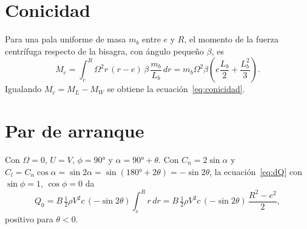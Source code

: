 \section{Conicidad}
Para una pala uniforme de masa $m_b$ entre $e$ y $R$, el momento de la fuerza centrífuga
respecto de la bisagra, con ángulo pequeño $\beta$, es
\begin{equation*}
  M_c=\int_e^R \Omega^2 r\,(r-e)\,\beta\,\frac{m_b}{L_b}\,dr
     = m_b\Omega^2\beta\left(e\frac{L_b}{2}+\frac{L_b^2}{3}\right).
\end{equation*}
Igualando $M_c=M_L-M_W$ se obtiene la ecuación~\eqref{eq:conicidad}.

\section{Par de arranque}
Con $\Omega=0$, $U=V$, $\phi=\ang{90}$ y $\alpha=\ang{90}+\theta$. Con $C_n=2\sin\alpha$ y
$C_l=C_n\cos\alpha=\sin2\alpha=\sin(\ang{180}+2\theta)=-\sin2\theta$, la
ecuación~\eqref{eq:dQ} con $\sin\phi=1$, $\cos\phi=0$ da
\begin{equation*}
  Q_0 = B\,\tfrac12\rho V^2 c\,(-\sin2\theta)\int_e^R r\,dr
      = B\,\tfrac12\rho V^2 c\,(-\sin2\theta)\,\frac{R^2-e^2}{2},
\end{equation*}
positivo para $\theta<0$.
